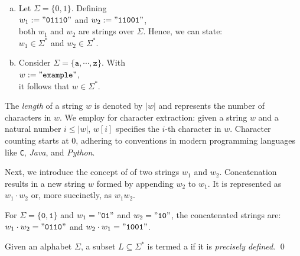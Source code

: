 \examplesEng
\begin{enumerate}[(a)]
\item Let \( \Sigma = \{0, 1\} \). Defining
      \\[0.2cm]
      \hspace*{1.3cm}
      \( w_1 := \mathtt{"01110"} \) and \( w_2 := \mathtt{"11001"} \),
      \\[0.2cm]
      both \( w_1 \) and \( w_2 \) are strings over \( \Sigma \). Hence, we can state:
      \\[0.2cm]
      \hspace*{1.3cm}
      \( w_1 \in \Sigma^* \) and \( w_2 \in \Sigma^* \).
\item Consider \( \Sigma = \{\mathtt{a}, \cdots, \mathtt{z}\} \). With
      \\[0.2cm]
      \hspace*{1.3cm}
      \( w := \mathtt{"example"} \),
      \\[0.2cm]
      it follows that \( w \in \Sigma^* \). \eox
\end{enumerate}

The \emph{length} of a string \( w \) is denoted by \( |w| \) and represents the number of characters in \( w
\).  
We employ  for character extraction: given a string \( w \) and a natural number
\( i \leq |w| \), \( w[i] \) specifies the \( i \)-th character in \( w \). Character counting starts at 0, adhering to
conventions in modern programming languages like \texttt{C}, \textsl{Java}, and \textsl{Python}. 

Next, we introduce the concept of   of two strings \( w_1 \) and
\(w_2 \). Concatenation results in a new string \( w \) formed by appending \( w_2 \) to \( w_1 \). It is
represented as \( w_1 \cdot w_2 \) or, more succinctly, as \( w_1w_2 \). 

\vspace*{0.3cm}

\exampleEng
For \( \Sigma = \{\mathtt{0}, \mathtt{1}\} \) and \( w_1 = \mathtt{"01"} \) and \( w_2 = \mathtt{"10"} \), the concatenated strings are:
\\[0.2cm]
\hspace*{1.3cm}
\( w_1 \cdot w_2 = \mathtt{"0110"} \) and \( w_2 \cdot w_1 = \mathtt{"1001"} \). \eox

\begin{Definition} \hspace*{\fill} \linebreak
Given an alphabet \( \Sigma \), a subset \( L \subseteq \Sigma^* \) is termed a  if it is \emph{precisely defined}.  \qed
\end{Definition}

